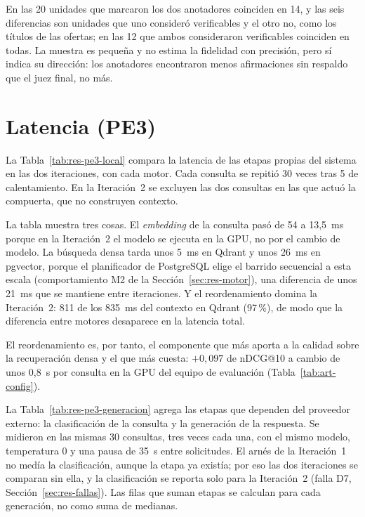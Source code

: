 En las 20 unidades que marcaron los dos anotadores coinciden en 14, y las seis diferencias son unidades que uno consideró verificables y el otro no, como los títulos de las ofertas; en las 12 que ambos consideraron verificables coinciden en todas. La muestra es pequeña y no estima la fidelidad con precisión, pero sí indica su dirección: los anotadores encontraron menos afirmaciones sin respaldo que el juez final, no más.

\section{Latencia (PE3)}
\label{sec:res-pe3}

La Tabla~\ref{tab:res-pe3-local} compara la latencia de las etapas propias del sistema en las dos iteraciones, con cada motor. Cada consulta se repitió 30 veces tras 5 de calentamiento. En la Iteración~2 se excluyen las dos consultas en las que actuó la compuerta, que no construyen contexto.



La tabla muestra tres cosas. El \textit{embedding} de la consulta pasó de 54 a 13,5~ms porque en la Iteración~2 el modelo se ejecuta en la GPU, no por el cambio de modelo. La búsqueda densa tarda unos 5~ms en Qdrant y unos 26~ms en pgvector, porque el planificador de PostgreSQL elige el barrido secuencial a esta escala (comportamiento M2 de la Sección~\ref{sec:res-motor}), una diferencia de unos 21~ms que se mantiene entre iteraciones. Y el reordenamiento domina la Iteración~2: 811 de los 835~ms del contexto en Qdrant (97\,\%), de modo que la diferencia entre motores desaparece en la latencia total.

El reordenamiento es, por tanto, el componente que más aporta a la calidad sobre la recuperación densa y el que más cuesta: $+0{,}097$ de nDCG@10 a cambio de unos 0,8~s por consulta en la GPU del equipo de evaluación (Tabla~\ref{tab:art-config}).

La Tabla~\ref{tab:res-pe3-generacion} agrega las etapas que dependen del proveedor externo: la clasificación de la consulta y la generación de la respuesta. Se midieron en las mismas 30 consultas, tres veces cada una, con el mismo modelo, temperatura 0 y una pausa de 35~s entre solicitudes. El arnés de la Iteración~1 no medía la clasificación, aunque la etapa ya existía; por eso las dos iteraciones se comparan sin ella, y la clasificación se reporta solo para la Iteración~2 (falla D7, Sección~\ref{sec:res-fallas}). Las filas que suman etapas se calculan para cada generación, no como suma de medianas.

